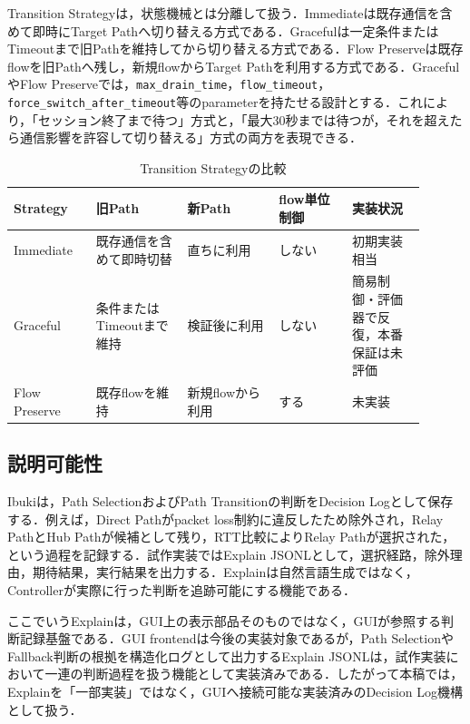 \documentclass[11pt,a4paper,twoside]{ltjsarticle}
\begin{document}
Transition Strategyは，状態機械とは分離して扱う．Immediateは既存通信を含めて即時にTarget Pathへ切り替える方式である．Gracefulは一定条件またはTimeoutまで旧Pathを維持してから切り替える方式である．Flow Preserveは既存flowを旧Pathへ残し，新規flowからTarget Pathを利用する方式である．GracefulやFlow Preserveでは，\texttt{max\_drain\_time}，\texttt{flow\_timeout}，\texttt{force\_switch\_after\_timeout}等のparameterを持たせる設計とする．これにより，「セッション終了まで待つ」方式と，「最大30秒までは待つが，それを超えたら通信影響を許容して切り替える」方式の両方を表現できる．

\begin{table}[h]
\centering
\caption{Transition Strategyの比較}
\label{tab:strategy}
\begin{tabular}{>{\raggedright\arraybackslash}p{0.18\linewidth}>{\raggedright\arraybackslash}p{0.20\linewidth}>{\raggedright\arraybackslash}p{0.20\linewidth}>{\raggedright\arraybackslash}p{0.16\linewidth}>{\raggedright\arraybackslash}p{0.16\linewidth}}
\toprule
Strategy & 旧Path & 新Path & flow単位制御 & 実装状況 \\
\midrule
Immediate & 既存通信を含めて即時切替 & 直ちに利用 & しない & 初期実装相当 \\
Graceful & 条件またはTimeoutまで維持 & 検証後に利用 & しない & 簡易制御・評価器で反復，本番保証は未評価 \\
Flow Preserve & 既存flowを維持 & 新規flowから利用 & する & 未実装 \\
\bottomrule
\end{tabular}
\end{table}

\subsection{説明可能性}
Ibukiは，Path SelectionおよびPath Transitionの判断をDecision Logとして保存する．例えば，Direct Pathがpacket loss制約に違反したため除外され，Relay PathとHub Pathが候補として残り，RTT比較によりRelay Pathが選択された，という過程を記録する．試作実装ではExplain JSONLとして，選択経路，除外理由，期待結果，実行結果を出力する．Explainは自然言語生成ではなく，Controllerが実際に行った判断を追跡可能にする機能である．

ここでいうExplainは，GUI上の表示部品そのものではなく，GUIが参照する判断記録基盤である．GUI frontendは今後の実装対象であるが，Path SelectionやFallback判断の根拠を構造化ログとして出力するExplain JSONLは，試作実装において一連の判断過程を扱う機能として実装済みである．したがって本稿では，Explainを「一部実装」ではなく，GUIへ接続可能な実装済みのDecision Log機構として扱う．
\end{document}
